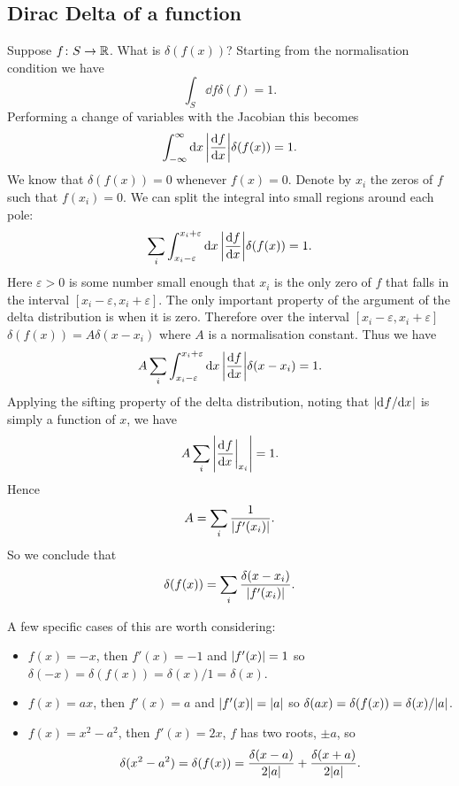 \documentclass[a4paper]{article}
\begin{document}
    \subsection{Dirac Delta of a function}
    Suppose \(f\colon S\to\mathbb{R}\).
    What is \(\delta(f(x))\)?
    Starting from the normalisation condition we have
    \[\int_S \dd{f}\delta(f) = 1.\]
    Performing a change of variables with the Jacobian this becomes
    \[\int_{-\infty}^{\infty} \dd{x}\abs{\dv{f}{x}}\delta(f(x)) = 1.\]
    We know that \(\delta(f(x)) = 0\) whenever \(f(x) = 0\).
    Denote by \(x_i\) the zeros of \(f\) such that \(f(x_i) = 0\).
    We can split the integral into small regions around each pole:
    \[\sum_i \int_{x_i - \varepsilon}^{x_i + \varepsilon} \dd{x} \abs{\dv{f}{x}}\delta(f(x)) = 1.\]
    Here \(\varepsilon > 0\) is some number small enough that \(x_i\) is the only zero of \(f\) that falls in the interval \([x_i - \varepsilon, x_i + \varepsilon]\).
    The only important property of the argument of the delta distribution is when it is zero.
    Therefore over the interval \([x_i - \varepsilon, x_i + \varepsilon]\) \(\delta(f(x)) = A\delta(x - x_i)\) where \(A\) is a normalisation constant.
    Thus we have
    \[A\sum_i \int_{x_i - \varepsilon}^{x_i + \varepsilon} \dd{x} \abs{\dv{f}{x}}\delta(x - x_i) = 1.\]
    Applying the sifting property of the delta distribution, noting that \(\abs{\mathrm{d}^{}{f}/\mathrm{d}{x}^{}}\) is simply a function of \(x\), we have
    \[A\sum_i\abs{\dv[]{f}{x}\biggr|_{x_i}} = 1.\]
    Hence
    \[A = \sum_i \frac{1}{\abs{f'(x_i)}}.\]
    So we conclude that
    \[\delta(f(x)) = \sum_i \frac{\delta(x - x_i)}{\abs{f'(x_i)}}.\]
    
    A few specific cases of this are worth considering:
    \begin{itemize}
        \item \(f(x) = -x\), then \(f'(x) = -1\) and \(\abs{f'(x)} = 1\) so \(\delta(-x) = \delta(f(x)) = \delta(x)/1 = \delta(x)\).
        \item \(f(x) = ax\), then \(f'(x) = a\) and \(\abs{f'(x)} = \abs{a}\) so \(\delta(ax) = \delta(f(x)) = \delta(x)/\abs{a}\).
        \item \(f(x) = x^2 - a^2\), then \(f'(x) = 2x\), \(f\) has two roots, \(\pm a\), so
        \[\delta(x^2 - a^2) = \delta(f(x)) = \frac{\delta(x - a)}{2\abs{a}} + \frac{\delta(x + a)}{2\abs{a}}.\]
    \end{itemize}
\end{document}
